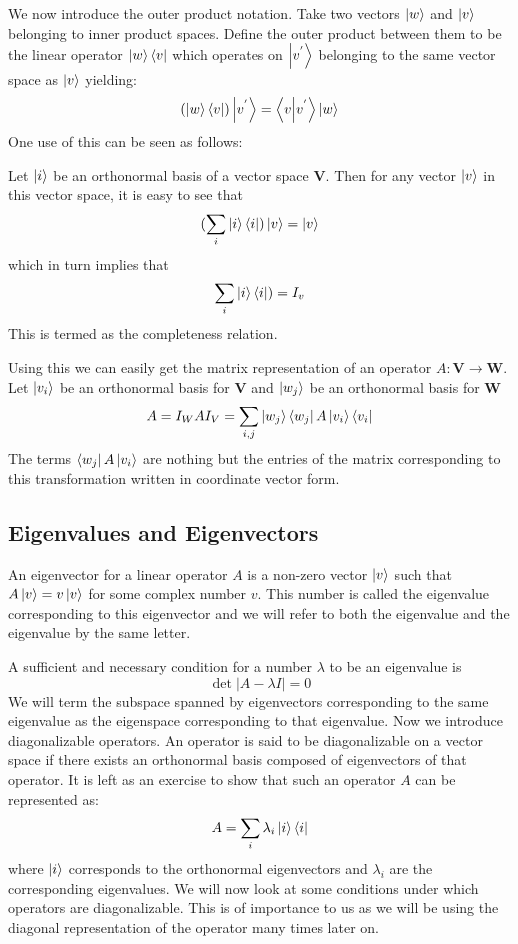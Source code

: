 We now introduce the outer product notation. Take two vectors $\ket{w} $ and $\ket{v}$ belonging to inner product spaces. Define the outer product between them to be the linear operator $\ket{w}\bra{v}$ which operates on $\ket{v^{'}}$ belonging to the same vector space as $\ket{v}$ yielding:
$$ (\ket{w}\bra{v})\ket{v^{'}} = \braket{v}{v^{'}}\ket{w} $$
One use of this can be seen as follows:

Let $\ket{i}$ be an orthonormal basis of a vector space $\textbf{V}$. Then for any vector $\ket{v}$ in this vector space, it is easy to see that 
$$(\sum_i \ket{i}\bra{i}) \ket{v} = \ket{v}$$
which in turn implies that $$\sum_i \ket{i}\bra{i}) = I_v $$
This is termed as the completeness relation.

Using this we can easily get the matrix representation of an operator $A: \textbf{V} \to \textbf{W}$. Let $\ket{v_i}$ be an orthonormal basis for $\textbf{V}$ and $\ket{w_j}$ be an orthonormal basis for $\textbf{W}$
$$A = I_{W}AI_{V} = \sum_{i, j} \ket{w_j}\bra{w_j}A\ket{v_i}\bra{v_i}$$
The terms $\bra{w_j}A\ket{v_i}$ are nothing but the entries of the matrix corresponding to this transformation written in coordinate vector form.

\subsection{Eigenvalues and Eigenvectors}
An eigenvector for a linear operator $A$ is a non-zero vector $\ket{v}$ such that $A\ket{v} = v\ket{v}$ for some complex number $v$. This number is called the eigenvalue corresponding to this eigenvector and we will refer to both the eigenvalue and the eigenvalue by the same letter.

A sufficient and necessary condition for a number $\lambda$ to be an eigenvalue is $$\det|A-\lambda I| = 0$$
We will term the subspace spanned by eigenvectors corresponding to the same eigenvalue as the eigenspace corresponding to that eigenvalue.
Now we introduce diagonalizable operators. An operator is said to be diagonalizable on a vector space if there exists an orthonormal basis composed of eigenvectors of that operator. It is left as an exercise to show that such an operator $A$ can be represented as:
$$ A = \sum_i \lambda_i \ket{i}\bra{i} $$ where $\ket{i}$ corresponds to the orthonormal eigenvectors and $\lambda_i$ are the corresponding eigenvalues.
We will now look at some conditions under which operators are diagonalizable. This is of importance to us as we will be using the diagonal representation of the operator many times later on.

